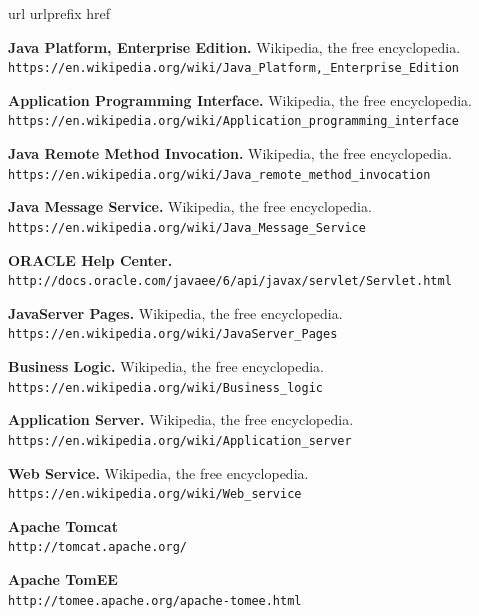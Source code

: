 \documentclass[a4paper, 10pt]{article}
\begin{document}
	
\newpage
\begin{thebibliography}{10}
	\expandafter\ifx\csname url\endcsname\relax
	  \def\url#1{\texttt{#1}}\fi
	\expandafter\ifx\csname urlprefix\endcsname\relax\def\urlprefix{URL }\fi
	\expandafter\ifx\csname href\endcsname\relax
	  \def\href#1#2{#2} \def\path#1{#1}\fi
	
	\textbf{Java Platform, Enterprise Edition.} Wikipedia, the free encyclopedia.\\
		\url{https://en.wikipedia.org/wiki/Java_Platform,_Enterprise_Edition}
	
	\textbf{Application Programming Interface.} Wikipedia, the free encyclopedia.\\
		\url{https://en.wikipedia.org/wiki/Application_programming_interface}
	
	\textbf{Java Remote Method Invocation.} Wikipedia, the free encyclopedia.\\
		\url{https://en.wikipedia.org/wiki/Java_remote_method_invocation}
	
	\textbf{Java Message Service.} Wikipedia, the free encyclopedia.\\
		\url{https://en.wikipedia.org/wiki/Java_Message_Service}
	
	\textbf{ORACLE Help Center.}\\
		\url{http://docs.oracle.com/javaee/6/api/javax/servlet/Servlet.html}
	
	\textbf{JavaServer Pages.} Wikipedia, the free encyclopedia.\\
		\url{https://en.wikipedia.org/wiki/JavaServer_Pages}
	
	\textbf{Business Logic.} Wikipedia, the free encyclopedia.\\
		\url{https://en.wikipedia.org/wiki/Business_logic}

	\textbf{Application Server.} Wikipedia, the free encyclopedia.\\
		\url{https://en.wikipedia.org/wiki/Application_server}

	\textbf{Web Service.} Wikipedia, the free encyclopedia.\\
		\url{https://en.wikipedia.org/wiki/Web_service}
	
	\textbf{Apache Tomcat}\\
		\url{http://tomcat.apache.org/}

	\textbf{Apache TomEE}\\
		\url{http://tomee.apache.org/apache-tomee.html}


\end{thebibliography}
\end{document}
